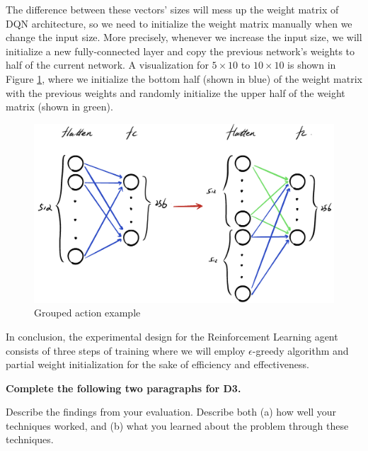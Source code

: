\documentclass[letterpaper]{article} %
\begin{document}
\begin{itemize}
\begin{enumerate}
    The difference between these vectors' sizes will mess up the weight matrix of DQN architecture, so we need to initialize the weight matrix manually when we change the input size. More precisely, whenever we increase the input size, we will initialize a new fully-connected layer and copy the previous network's weights to half of the current network. A visualization for $5\times 10$ to $10\times 10$ is shown in Figure \ref{fig:training}, where we initialize the bottom half (shown in blue) of the weight matrix with the previous weights and randomly initialize the upper half of the weight matrix (shown in green).

    \begin{figure}[h]
      \centering
      \includegraphics[width=0.9\linewidth]{figures/architecutre.jpeg}
      \caption{Grouped action example}
      \label{fig:training}
    \end{figure}


  \end{enumerate}
  In conclusion, the experimental design for the Reinforcement Learning agent consists of three steps of training where we will employ $\epsilon$-greedy algorithm and partial weight initialization for the sake of efficiency and effectiveness. 
\end{itemize}





{\bf Complete the following two paragraphs for D3.}

Describe the findings from your evaluation.  Describe both (a) how well your techniques worked, and (b) what you learned about the problem through these techniques.  
\end{document}
